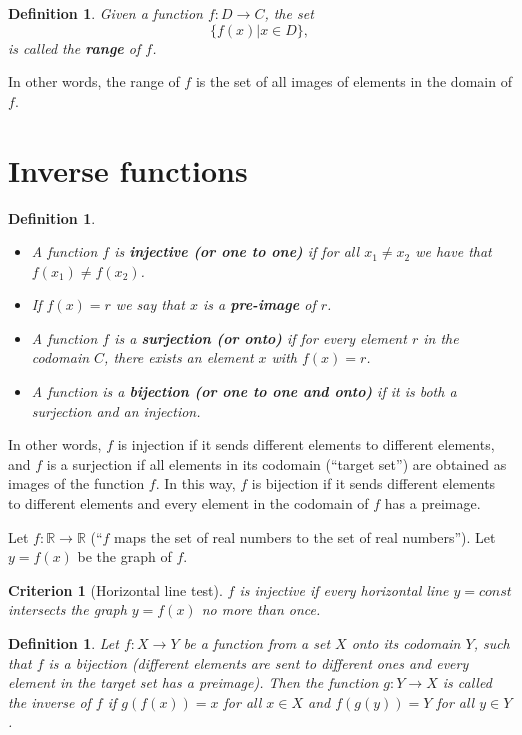 \documentclass[12pt]{book}
\newtheorem{criterion}[theorem]{Criterion}
\newtheorem{definition}[theorem]{Definition}
\renewcommand{\emph}{\textbf}
\begin{document}
\begin{definition}
Given a function $f:D\to C$, the set
\[
 \{f(x) | x\in D \},
\]
is called the \emph{range} of $f$.
\end{definition}
In other words, the range of $f$ is the set of all images of elements in the domain of $f$.
\section{Inverse functions}

\begin{definition} ~
\begin{itemize}
\item {} A function $f$ is \emph{injective (or one to one)} if  for all $x_1\neq x_2$ we have that $f(x_1)\neq f(x_2)$.
\item {} If $f(x)=r$ we say that $x$ is a \emph{pre-image} of $r$.
\item {}
A function $f$ is a \emph{surjection (or onto)} if for every element $r$ in the codomain $C$, there exists an element $x$ with $f(x)=r$.
\item {} A function is a \emph{bijection (or one to one and onto)} if it is both a surjection and an injection.
\end{itemize}
\end{definition}
In other words, $f$ is injection if it sends different elements to different elements, and $f$ is a surjection if all elements in its  codomain (``target set'') are obtained as images of the function $f$. In this way, $f$ is bijection if it sends different elements to different elements and every element in the codomain of $f$ has a preimage.

Let $f: \mathbb R\to \mathbb R$ (``$f$ maps the set of real numbers to the set of real numbers''). Let $y=f(x)$ be the graph of $f$.
\begin{criterion}[Horizontal line test]
$f$ is injective if every horizontal line $y=const$ intersects the graph $y=f(x)$ no more than once.
\end{criterion}

\begin{definition}
Let $f:X\to Y$ be a function from a set $X$ onto its codomain $Y$, such that $f$ is a bijection (different elements are sent to different ones and every element in the target set has a preimage). Then the function $g: Y\to X$ is called the inverse of $f$ if $g(f(x))=x$ for all $x\in X$ and $f(g(y))=Y$ for all $y\in Y$.
\end{definition}
\end{document}
